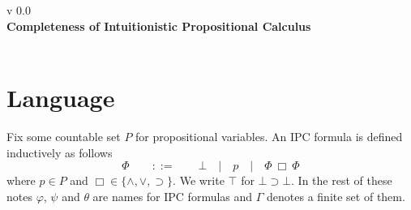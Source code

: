 \documentclass[a4paper,12pt]{paper}
\begin{document}
{\noindent
	v 0.0 \\
{\large\textbf{Completeness of Intuitionistic Propositional Calculus}} \\
}
\\
\setcounter{section}{-1}
\section{Language} Fix some countable set $P$ for propositional variables. An IPC formula is defined inductively as follows
\[ \Phi \qquad::=\qquad \bot \quad|\quad p \quad|\quad \Phi ~\Box~ \Phi \]
where $p \in P$ and $\Box \in \{ \land , \lor , \supset \}$. We write $\top$ for $\bot \supset \bot$.
In the rest of these notes $\varphi$, $\psi$ and $\theta$ are names for IPC formulas and $\Gamma$ denotes a finite set of them.
\end{document}
